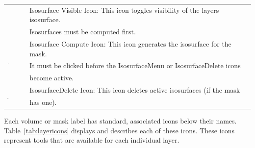 \documentclass[fleqn,11pt,openany]{book}
\begin{document}
\begin{table}[h!]
\begin{tabular}{|l|l|}
& Isosurface Visible Icon: This icon toggles visibility of the layers isosurface.  \\
& Isosurfaces must be computed first.\\
\hline
\multirow{3}{*}{ \includegraphics[width=0.05\textwidth]{Seg3DBasicFunctionality_figures/IsosurfaceComputeOff.png} }
& Isosurface Compute Icon: This icon generates the isosurface for the mask.\\
& It must be clicked before the IsosurfaceMenu or IsosurfaceDelete icons\\
& become active.\\
\hline
\multirow{2}{*}{ \includegraphics[width=0.05\textwidth]{Seg3DBasicFunctionality_figures/IsosurfaceDeleteOff.png} }
& IsosurfaceDelete Icon: This icon deletes active isosurfaces (if the mask\\
& has one).\\
\hline
\end{tabular}
\end{table}

Each volume or mask label has  standard, associated icons below their names.  Table~\ref{tab:layericons} displays and describes each of these icons.  These icons represent tools that are available for each individual layer. 
\end{document}
